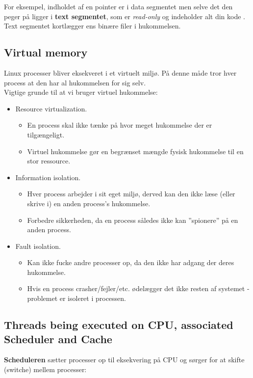 For eksempel, indholdet af en pointer er i data segmentet  men selve det den peger på ligger i \textbf{text segmentet}, som er \textit{read-only} og indeholder alt din kode . Text segmentet kortlægger ens binære filer i hukommelsen.

\subsection{Virtual memory}
Linux processer bliver eksekveret i et virtuelt miljø. På denne måde tror hver process at den har al hukommelsen for sig selv.\\

Vigtige grunde til at vi bruger virtuel hukommelse:

\begin{itemize}
	\item Resource virtualization.
	\begin{itemize}
		\item En process skal ikke tænke på hvor meget hukommelse der er tilgængeligt.
		\item Virtuel hukommelse gør en begrænset mængde fysisk hukommelse til en stor ressource.
	\end{itemize}
	\item Information isolation.
	\begin{itemize}
		\item Hver process arbejder i sit eget miljø, derved kan den ikke læse (eller skrive i) en anden process's hukommelse.
		\item Forbedre sikkerheden, da en process således ikke kan ''spionere'' på en anden process.
	\end{itemize}
	\item Fault isolation.
	\begin{itemize}
		\item Kan ikke fucke andre processer op, da den ikke har adgang der deres hukommelse.
		\item Hvis en process crasher/fejler/etc. ødelægger det ikke resten af systemet - problemet er isoleret i processen.
	\end{itemize}
\end{itemize}

\subsection{Threads being executed on CPU, associated Scheduler and Cache}
\textbf{Scheduleren} sætter processer op til eksekvering på CPU og sørger for at skifte (switche) mellem processer:

